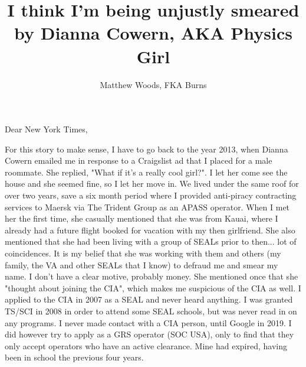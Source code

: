 \documentclass[a4paper]{arthur-letter}
\title{I think I'm being unjustly smeared by Dianna Cowern, AKA Physics Girl}
\author{Matthew Woods, FKA Burns}
\begin{document}
    \makeprofile %
    
    \address{Matthew Woods,\\PO Box 376\\Mountain View, CA}

    \begin{letter}

            \subject{I'm a former Navy SEAL, smeared by Dianna Cowern (AKA Physics Girl) via Alphabet Inc while working as a Google employee.}

            \opening{Dear New York Times,}

            For this story to make sense, I have to go back to the year 2013, when Dianna Cowern emailed me in response to a Craigslist ad that I placed for a male roommate. She replied, "What if it's a really cool girl?". I let her come see the house and she seemed fine, so I let her move in. We lived under the same roof for over two years, save a six month period where I provided anti-piracy contracting services to Maersk via The Trident Group as an APASS operator. When I met her the first time, she casually mentioned that she was from Kauai, where I already had a future flight booked for vacation with my then girlfriend. She also mentioned that she had been living with a group of SEALs prior to then... lot of coincidences. It is my belief that she was working with them and others (my family, the VA and other SEALs that I know) to defraud me and smear my name. I don't have a clear motive, probably money. She mentioned once that she "thought about joining the CIA", which makes me suspicious of the CIA as well. I applied to the CIA in 2007 as a SEAL and never heard anything. I was granted TS/SCI in 2008 in order to attend some SEAL schools, but was never read in on any programs. I never made contact with a CIA person, until Google in 2019. I did however try to apply as a GRS operator (SOC USA), only to find that they only accept operators who have an active clearance. Mine had expired, having been in school the previous four years. \\ 
            

\end{letter}
\end{document}
